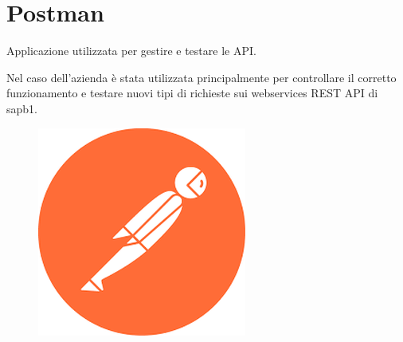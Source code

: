\section{Postman}
\begin{flushleft}
    Applicazione utilizzata per gestire e testare le API.
    
    Nel caso dell'azienda è stata utilizzata principalmente per controllare il corretto funzionamento e testare nuovi tipi di richieste sui webservices REST API di \gls{sapb1}.
\end{flushleft}

\begin{figure}[!h] 
	\centering
	\includegraphics[scale = 0.5]{immagini/tecnologie/postman}
\end{figure}